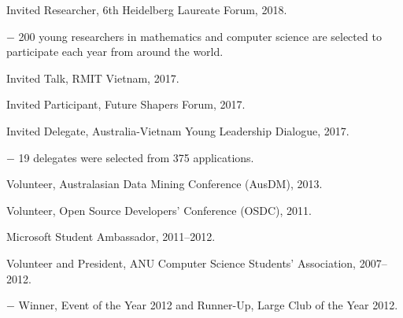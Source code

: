 \documentclass[10pt]{article}
\begin{document}
\begin{innerlist}

\item Invited Researcher, 6th Heidelberg Laureate Forum, 2018.
\begin{innerlist}
\item[$-$] 200 young researchers in mathematics and computer science are selected to participate each year from around the world.
\end{innerlist}




\item Invited Talk, RMIT Vietnam, 2017.

\item Invited Participant, Future Shapers Forum, 2017.

\item Invited Delegate, Australia-Vietnam Young Leadership Dialogue, 2017.
\begin{innerlist}
\item[$-$] 19 delegates were selected from 375 applications.
\end{innerlist}

\item Volunteer, Australasian Data Mining Conference (AusDM), 2013.

\item Volunteer, Open Source Developers' Conference (OSDC), 2011.

\item Microsoft Student Ambassador, 2011--2012.

\item Volunteer and President, ANU Computer Science Students' Association, 2007--2012.
\begin{innerlist}
\item[$-$] Winner, Event of the Year 2012 and Runner-Up, Large Club of the Year 2012.
\end{innerlist}

\end{innerlist}
\end{document}
